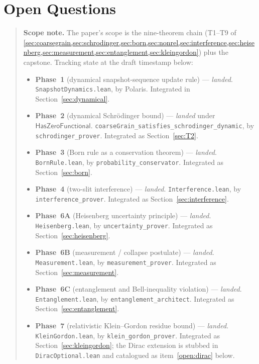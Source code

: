 \documentclass[11pt,a4paper,twoside]{article}
\theoremstyle{definition}
\newcommand{\HasZF}{\mathsf{HasZeroFunctional}}
\newcommand{\code}[1]{\texttt{#1}}
\begin{document}
\section{Open Questions}\label{sec:open}

\begin{quote}
\textbf{Scope note.} The paper's scope is the nine-theorem chain
(T1--T9 of \cref{sec:coarsegrain,sec:schrodinger,sec:born,sec:nonrel,sec:interference,sec:heisenberg,sec:measurement,sec:entanglement,sec:kleingordon})
plus the capstone. Tracking state at the draft timestamp below:

\begin{itemize}
\item \textbf{Phase~1} (dynamical snapshot-sequence update rule)
  --- \emph{landed}. \code{SnapshotDynamics.lean}, by Polaris.
  Integrated in Section~\ref{sec:dynamical}.
\item \textbf{Phase~2} (dynamical Schr\"odinger bound) ---
  \emph{landed} under $\HasZF$.
  \code{coarseGrain\_satisfies\_schrodinger\_dynamic}, by
  \code{schrodinger\_prover}. Integrated as Section~\ref{sec:T2}.
\item \textbf{Phase~3} (Born rule as a conservation theorem) ---
  \emph{landed}. \code{BornRule.lean}, by
  \code{probability\_conservator}. Integrated as
  Section~\ref{sec:born}.
\item \textbf{Phase~4} (two-slit interference) --- \emph{landed}.
  \code{Interference.lean}, by \code{interference\_prover}.
  Integrated as Section~\ref{sec:interference}.
\item \textbf{Phase~6A} (Heisenberg uncertainty principle) ---
  \emph{landed}. \code{Heisenberg.lean}, by
  \code{uncertainty\_prover}. Integrated as
  Section~\ref{sec:heisenberg}.
\item \textbf{Phase~6B} (measurement / collapse postulate) ---
  \emph{landed}. \code{Measurement.lean}, by
  \code{measurement\_prover}. Integrated as
  Section~\ref{sec:measurement}.
\item \textbf{Phase~6C} (entanglement and Bell-inequality violation)
  --- \emph{landed}. \code{Entanglement.lean}, by
  \code{entanglement\_architect}. Integrated as
  Section~\ref{sec:entanglement}.
\item \textbf{Phase~7} (relativistic Klein--Gordon residue bound)
  --- \emph{landed}. \code{KleinGordon.lean}, by
  \code{klein\_gordon\_prover}. Integrated as
  Section~\ref{sec:kleingordon}; the Dirac extension is stubbed in
  \code{DiracOptional.lean} and catalogued as
  item~\ref{open:dirac} below.
\end{itemize}
\end{quote}
\end{document}
